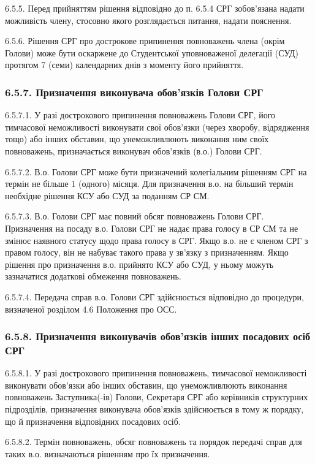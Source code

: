    6.5.5. Перед прийняттям рішення відповідно до п. 6.5.4 СРГ зобов'язана надати можливість члену, стосовно якого розглядається питання, надати пояснення.

    6.5.6. Рішення СРГ про дострокове припинення повноважень члена (окрім Голови) може бути оскаржене до Студентської уповноваженої делегації (СУД) протягом 7 (семи) календарних днів з моменту його прийняття.

    \subsubsection*{6.5.7. Призначення виконувача обов'язків Голови СРГ}
        6.5.7.1. У разі дострокового припинення повноважень Голови СРГ, його тимчасової неможливості виконувати свої обов'язки (через хворобу, відрядження тощо) або інших обставин, що унеможливлюють виконання ним своїх повноважень, призначається виконувач обов'язків (в.о.) Голови СРГ.

        6.5.7.2. В.о. Голови СРГ може бути призначений колегіальним рішенням СРГ на термін не більше 1 (одного) місяця. Для призначення в.о. на більший термін необхідне рішення КСУ або СУД за поданням СР СМ.

        6.5.7.3. В.о. Голови СРГ має повний обсяг повноважень Голови СРГ. Призначення на посаду в.о. Голови СРГ не надає права голосу в СР СМ та не змінює наявного статусу щодо права голосу в СРГ. Якщо в.о. не є членом СРГ з правом голосу, він не набуває такого права у зв'язку з призначенням. Якщо рішення про призначення в.о. прийнято КСУ або СУД, у ньому можуть зазначатися додаткові обмеження повноважень.

        6.5.7.4. Передача справ в.о. Голови СРГ здійснюється відповідно до процедури, визначеної розділом 4.6 Положення про ОСС.

    \subsubsection*{6.5.8. Призначення виконувачів обов'язків інших посадових осіб СРГ}
        6.5.8.1. У разі дострокового припинення повноважень, тимчасової неможливості виконувати обов'язки або інших обставин, що унеможливлюють виконання повноважень Заступника(-ів) Голови, Секретаря СРГ або керівників структурних підрозділів, призначення виконувача обов'язків здійснюється в тому ж порядку, що й призначення відповідних посадових осіб.

        6.5.8.2. Термін повноважень, обсяг повноважень та порядок передачі справ для таких в.о. визначаються рішенням про їх призначення.

